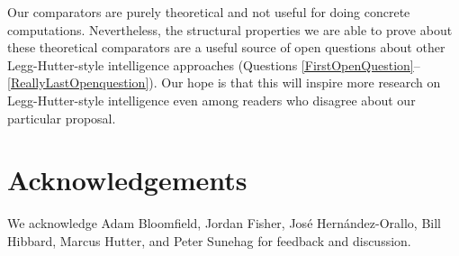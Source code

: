 \documentclass[twoside,11pt]{article}
\begin{document}
Our comparators are purely theoretical and not useful
for doing concrete computations. Nevertheless, the structural
properties we are able to prove about these theoretical comparators
are a useful source of open questions about other Legg-Hutter-style
intelligence approaches (Questions \ref{FirstOpenQuestion}--\ref{ReallyLastOpenquestion}).
Our hope is that this will inspire more research on Legg-Hutter-style intelligence
even among readers who disagree about our particular proposal.

\section*{Acknowledgements}


We acknowledge Adam Bloomfield, Jordan Fisher,
Jos{\'e} Hern{\'a}ndez-Orallo,
Bill Hibbard, Marcus Hutter, and Peter Sunehag for feedback and discussion.



\end{document}
